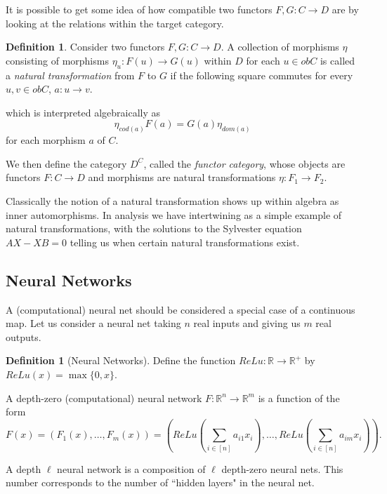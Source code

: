 \documentclass[12pt]{amsart}
\theoremstyle{definition}
\newtheorem{definition}[theorem]{Definition}
\numberwithin{equation}{section}
\begin{document}
It is possible to get some idea of how compatible two functors $F, G: C \rightarrow D$ are by looking at the relations within the target category. 

\begin{definition}
    Consider two functors $F, G: C\rightarrow D$. A collection of morphisms $\eta$ consisting of morphisms $\eta_u: F(u) \rightarrow G(u)$ within $D$ for each $u\in obC$ is called a \textit{natural transformation} from $F$ to $G$ if the following square commutes for every $u, v \in ob C$, $a :u\rightarrow v.$ 
     \begin{center} \end{center} which is interpreted algebraically as \[\eta_{cod(a)}F(a) = G(a)\eta_{dom(a)}\]
for each morphism $a$ of $C.$
\end{definition}

We then define the category $D^C$, called the \textit{functor category}, whose objects are functors $F: C\rightarrow D$ and morphisms are natural transformations $\eta: F_1 \rightarrow F_2$. 

Classically the notion of a natural transformation shows up within algebra as inner automorphisms. In analysis we have intertwining as a simple example of natural transformations, with the solutions to the Sylvester equation $AX - XB =0$ telling us when certain natural transformations exist. 

\subsection{Neural Networks}

A (computational) neural net should be considered a special case of a continuous map. Let us consider a neural net taking $n$ real inputs and giving us $m$ real outputs. 

\begin{definition}[Neural Networks]
    Define the function $ReLu: \mathbb R\rightarrow \mathbb R^+$ by $ReLu(x) = \max\{0,x\}$.
    
    A depth-zero (computational) neural network $F: \mathbb R^n \rightarrow \mathbb R^m$ is a function of the form \begin{equation}F(x) = (F_1(x), \dots, F_m(x)) = (ReLu\left(\sum_{i \in [n]}a_{i1}x_i\right), \dots, ReLu\left(\sum_{i\in [n]}a_{im}x_i\right)).\end{equation}

    A depth $\ell$ neural network is a composition of $\ell$ depth-zero neural nets. This number corresponds to the number of ``hidden layers" in the neural net. 
\end{definition}
\end{document}
